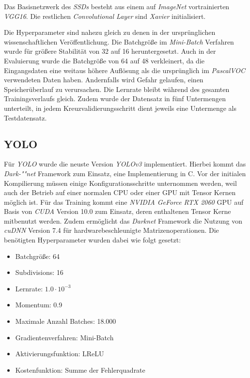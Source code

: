 Das Basisnetzwerk des \textit{SSDs} besteht aus einem auf \textit{ImageNet} vortrainierten \textit{VGG16}. Die restlichen \textit{Convolutional Layer} sind \textit{Xavier} initialisiert. 

Die Hyperparameter sind nahezu gleich zu denen in der ursprünglichen wissenschaftlichen Veröffentlichung. Die Batchgröße im \textit{Mini-Batch} Verfahren wurde für größere Stabilität von 32 auf 16 heruntergesetzt. Auch in der Evaluierung wurde die Batchgröße von 64 auf 48 verkleinert, da die Eingangsdaten eine weitaus höhere Auflösung als die ursprünglich im \textit{PascalVOC} verwendeten Daten haben. Andernfalls wird Gefahr gelaufen, einen Speicherüberlauf zu verursachen. Die Lernrate bleibt während des gesamten Trainingsverlaufs gleich. Zudem wurde der Datensatz in fünf Untermengen unterteilt, in jedem Kreuzvalidierungsschritt dient jeweils eine Untermenge als Testdatensatz.

\subsection*{YOLO}

Für \textit{YOLO} wurde die neuste Version \textit{YOLOv3} implementiert. Hierbei kommt das \textit{Dark-""net} Framework zum Einsatz, eine Implementierung in C. Vor der initialen Kompilierung müssen einige Konfigurationsschritte unternommen werden, weil auch der Betrieb auf einer normalen CPU oder einer GPU mit Tensor Kernen möglich ist. Für das Training kommt eine \textit{NVIDIA GeForce RTX 2060} GPU auf Basis von \textit{CUDA} Version 10.0 zum Einsatz, deren enthaltenen Tensor Kerne mitbenutzt werden. Zudem ermöglicht das \textit{Darknet} Framework die Nutzung von \textit{cuDNN} Version 7.4 für hardwarebeschleunigte Matrizenoperationen. Die benötigten Hyperparameter wurden dabei wie folgt gesetzt:

\begin{itemize}
	\item Batchgröße: 64
	\item Subdivisions: 16
	\item Lernrate: $1.0\cdot 10^{-3}$
	\item Momentum: 0.9
	\item Maximale Anzahl Batches: 18.000
	\item Gradientenverfahren: Mini-Batch
	\item Aktivierungsfunktion: LReLU
	\item Kostenfunktion: Summe der Fehlerquadrate
\end{itemize}

